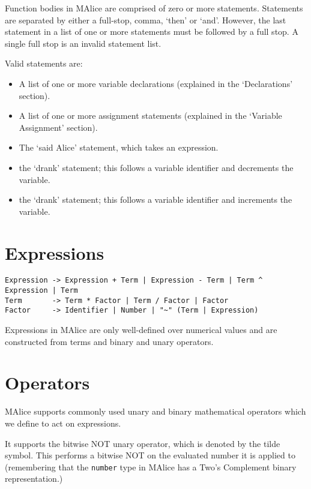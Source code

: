 \documentclass[a4wide, 11pt]{article}
\begin{document}
Function bodies in MAlice are comprised of zero or more statements. Statements are separated by either a full-stop, comma, `then' or `and'. However, the last statement in a list of one or more statements must be followed by a full stop. A single full stop is an invalid statement list.

Valid statements are:
\begin{itemize}

\item A list of one or more variable declarations (explained in the `Declarations' section).
\item A list of one or more assignment statements (explained in the `Variable Assignment' section).
\item The `said Alice' statement, which takes an expression.
\item the `drank' statement; this follows a variable identifier and decrements the variable.
\item the `drank' statement; this follows a variable identifier and increments the variable.

\end{itemize}
  
\section{Expressions}

\begin{verbatim}
Expression -> Expression + Term | Expression - Term | Term ^ Expression | Term
Term       -> Term * Factor | Term / Factor | Factor
Factor     -> Identifier | Number | "~" (Term | Expression)

\end{verbatim}

Expressions in MAlice are only well-defined over numerical values and are constructed from terms and binary and unary operators.

\section{Operators}

MAlice supports commonly used unary and binary mathematical operators which we define to act on expressions.

It supports the bitwise NOT unary operator, which is denoted by the tilde symbol. This performs a bitwise NOT on the evaluated number it is applied to (remembering that the \texttt{number} type in MAlice has a Two's Complement binary representation.)
\end{document}
